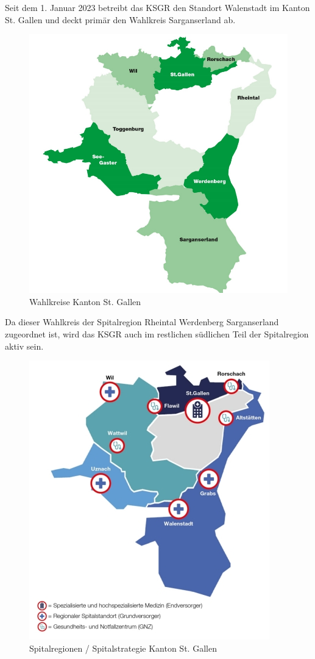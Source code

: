 \begin{flushleft}
    Seit dem 1. Januar 2023 betreibt das KSGR den Standort Walenstadt im Kanton St. Gallen und deckt primär den Wahlkreis Sarganserland ab.
    \begin{figure}[H]
        \centering
        \includegraphics[width=0.75\linewidth]{source/introduction/initial_situation/sg_wahlkreise}
        \caption{Wahlkreise Kanton St. Gallen\cite{LEZ4SPDD}}
        \label{fig:sg_wahlkreise}
    \end{figure}
\end{flushleft}
\begin{flushleft}
    Da dieser Wahlkreis der Spitalregion Rheintal Werdenberg Sarganserland zugeordnet ist, wird das KSGR auch im restlichen südlichen Teil der Spitalregion aktiv sein.
    \begin{figure}[H]
        \centering
        \includegraphics[width=0.5\linewidth]{source/introduction/initial_situation/sg_spitalregionen}
        \caption{Spitalregionen / Spitalstrategie Kanton St. Gallen\cite{3L8EIPUP}}
        \label{fig:sg_spitalregionen}
    \end{figure}
\end{flushleft}
